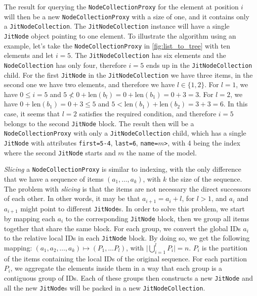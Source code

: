 The result for querying the \texttt{NodeCollectionProxy} for the element at position $i$ will then be a new \texttt{NodeCollectionProxy} with a size of one, and it contains only a \texttt{JitNodeCollection}. The \texttt{JitNodeCollection} instance will have a single \texttt{JitNode} object pointing to one element. To illustrate the algorithm using an example, let's take the \texttt{NodeCollectionProxy} in \autoref{fig:list_to_tree} with ten elements and let $i = 5$. The \texttt{JitNodeCollection} has six elements and the \texttt{NodeCollection} has only four, therefore $i=5$ ends up in the \texttt{JitNodeCollection} child. For the first \texttt{JitNode} in the \texttt{JitNodeCollection} we have three items, in the second one we have two elements, and therefore we have $l \in \{1, 2\}$. For $l = 1$, we have $0 \leq i = 5$ and $5 \not < 0 + \text{len}(b_l) = 0 + \text{len}(b_1) = 0 + 3 = 3$. For $l = 2$, we have $0 + \text{len}(b_1) = 0 + 3 \leq 5$ and $5 < \text{len}(b_1) + \text{len}(b_2) = 3 + 3 = 6$. In this case, it seems that $l = 2$ satisfies the required condition, and therefore $i = 5$ belongs to the second \texttt{JitNode} block. The result then will be a \texttt{NodeCollectionProxy} with only a \texttt{JitNodeCollection} child, which has a single \texttt{JitNode} with attributes \texttt{first=5-4}, \texttt{last=6}, \texttt{name=$m$>}, with 4 being the index where the second \texttt{JitNode} starts and $m$ the name of the model.

\emph{Slicing} a \texttt{NodeCollectionProxy} is similar to indexing, with the only difference that we have a sequence of items $(a_1, \dots, a_k)$, with $k$ the size of the sequence. The problem with \emph{slicing} is that the items are not necessary the direct successors of each other. In other words, it may be that $a_{i+1} =a_i + l$, for $l > 1$, and $a_i$ and $a_{i+1}$ might point to different \texttt{JitNode}s. In order to solve this problem, we start by mapping each $a_i$ to the corresponding \texttt{JitNode} block, then we group all items together that share the same block. For each group, we convert the global IDs $a_i$ to the relative local IDs in each \texttt{JitNode} block. By doing so, we get the following mapping: $(a_1, a_2, \dots, a_k) \mapsto (P_1, \dots P_l)$, with $\lvert\bigcup_{i=1}^{l} P_{i}\rvert =n$. $P_i$ is the partition of the items containing the local IDs of the original sequence. For each partition $P_i$, we aggregate the elements inside them in a way that each group is a contiguous group of IDs. Each of these groups then constructs a new \texttt{JitNode} and all the new \texttt{JitNode}s will be packed in a new \texttt{JitNodeCollection}.

